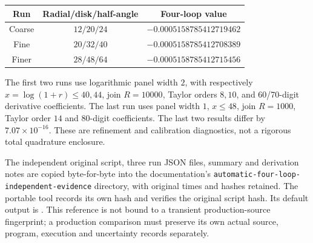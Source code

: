\begin{center}
\begin{tabular}{c c c}
\hline
Run & Radial/disk/half-angle & Four-loop value\\
\hline
Coarse & $12/20/24$ & $-0.0005158785412719462$\\
Fine & $20/32/40$ & $-0.0005158785412708389$\\
Finer & $28/48/64$ & $-0.0005158785412715456$\\
\hline
\end{tabular}
\end{center}
The first two runs use logarithmic panel width $2$, with respectively
$x=\log(1+r)\leq40,44$, join $R=10000$, Taylor orders $8,10$, and
60/70-digit derivative coefficients.  The last run uses panel width $1$,
$x\leq48$, join $R=1000$, Taylor order $14$ and 80-digit coefficients.
The last two results differ by $7.07\times10^{-16}$.  These are refinement
and calibration diagnostics, not a rigorous total quadrature enclosure.

The independent original script, three run JSON files, summary and
derivation notes are copied byte-for-byte into the documentation's
\texttt{automatic-four-loop-independent-evidence} directory, with original
times and hashes retained.  The portable tool
records its own hash and verifies the original script hash.  Its default
output is .
This reference is not bound to a transient production-source fingerprint;
a production comparison must preserve its own actual source, program,
execution and uncertainty records separately.

